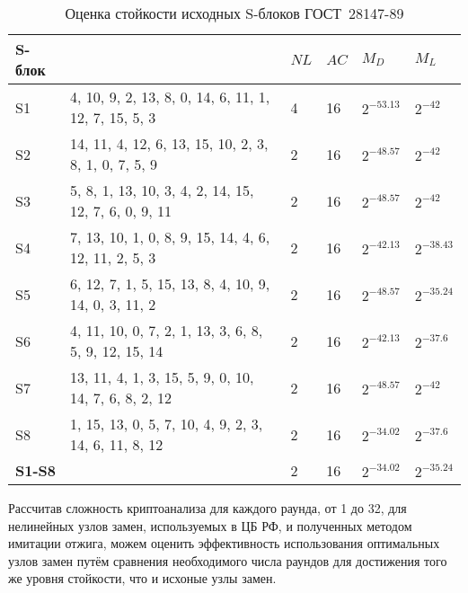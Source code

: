 \begin{table}[ht]
    \caption{Оценка стойкости исходных S-блоков ГОСТ~28147-89}
    \label{table:security_evaluation_GOST}
    \begin{tabular}{| m{2.75cm} | m{5.5cm} | m{1cm} | m{1cm} | m{2cm} | m{2cm} |}
        \hline
        S-блок      &                                                      & $NL$   & $AC$  & $M_D$             & $M_L$             \\ \hline
        S1          & 4, 10, 9, 2, 13, 8, 0, 14, 6, 11, 1, 12, 7, 15, 5, 3 & 4      & 16    & $2^{-53.13}$      & $2^{-42}$         \\ \hline
        S2          & 14, 11, 4, 12, 6, 13, 15, 10, 2, 3, 8, 1, 0, 7, 5, 9 & 2      & 16    & $2^{-48.57}$      & $2^{-42}$         \\ \hline
        S3          & 5, 8, 1, 13, 10, 3, 4, 2, 14, 15, 12, 7, 6, 0, 9, 11 & 2      & 16    & $2^{-48.57}$      & $2^{-42}$         \\ \hline
        S4          & 7, 13, 10, 1, 0, 8, 9, 15, 14, 4, 6, 12, 11, 2, 5, 3 & 2      & 16    & $2^{-42.13}$      & $2^{-38.43}$      \\ \hline
        S5          & 6, 12, 7, 1, 5, 15, 13, 8, 4, 10, 9, 14, 0, 3, 11, 2 & 2      & 16    & $2^{-48.57}$      & \bf $2^{-35.24}$  \\ \hline
        S6          & 4, 11, 10, 0, 7, 2, 1, 13, 3, 6, 8, 5, 9, 12, 15, 14 & 2      & 16    & $2^{-42.13}$      & $2^{-37.6}$       \\ \hline
        S7          & 13, 11, 4, 1, 3, 15, 5, 9, 0, 10, 14, 7, 6, 8, 2, 12 & 2      & 16    & $2^{-48.57}$      & $2^{-42}$         \\ \hline
        S8          & 1, 15, 13, 0, 5, 7, 10, 4, 9, 2, 3, 14, 6, 11, 8, 12 & 2      & 16    & \bf $2^{-34.02}$  & $2^{-37.6}$       \\ \hline
        \bf S1-S8   &                                                      & 2      & 16    & $2^{-34.02}$      & $2^{-35.24}$      \\ \hline
    \end{tabular}
\end{table}

Рассчитав сложность криптоанализа для каждого раунда, от 1 до 32, для нелинейных
узлов замен, используемых в ЦБ РФ, и полученных методом имитации отжига, можем
оценить эффективность использования оптимальных узлов замен путём сравнения
необходимого числа раундов для достижения того же уровня стойкости, что и
исхоные узлы замен.

